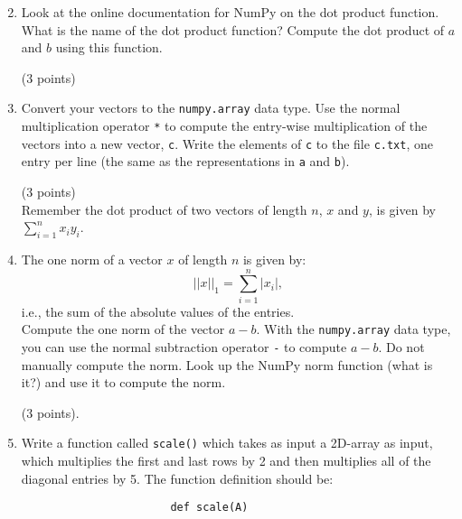 \documentclass{article}
\newcommand{\ssum}[3]{\displaystyle\sum\limits_{#1}^{#2} #3}
\newcounter{points}
\newcommand\setpoints[1]{\addtocounter{points}{#1}(#1 points)}
\begin{document}
\begin{enumerate}
\begin{enumerate}
\setcounter{enumii}{1}
\item Look at the online documentation for NumPy on the dot product function.  What is the name of the dot product function?  Compute the dot product of $a$ and $b$ using this function. \setpoints{3}
\end{enumerate}

\begin{enumerate}
\setcounter{enumii}{2}
\item Convert your vectors to the \texttt{numpy.array} data type.  Use the normal multiplication operator \texttt{*} to compute the entry-wise multiplication of the vectors into a new vector, \texttt{c}.  Write the elements of \texttt{c} to the file \texttt{c.txt}, one entry per line (the same as the representations in \texttt{a} and \texttt{b}). \setpoints{3} \\

Remember the dot product of two vectors of length $n$, $x$ and $y$, is given by $\ssum{i=1}{n}{x_iy_i}$.
\end{enumerate}

\begin{enumerate}
\setcounter{enumii}{3}
\item The one norm of a vector $x$ of length $n$ is given by:
\[
||x||_1 = \ssum{i=1}{n}{|x_i|},
\]
 i.e., the sum of the absolute values of the entries. \\

Compute the one norm of the vector $a - b$.  With the \texttt{numpy.array} data type, you can use the normal subtraction operator \texttt{-} to compute $a - b$.  Do not manually compute the norm.  Look up the NumPy norm function (what is it?) and use it to compute the norm. \setpoints{3}.
\end{enumerate}

\begin{enumerate}
\setcounter{enumii}{4}
\item Write a function called \texttt{scale()} which takes as input a 2D-array as input, which multiplies the first and last rows by 2 and then multiplies all of the diagonal entries by 5.  The function definition should be:

\begin{lstlisting}
                       def scale(A)
\end{lstlisting}

\vspace{0.1in}


\end{enumerate}
\end{enumerate}
\end{document}
